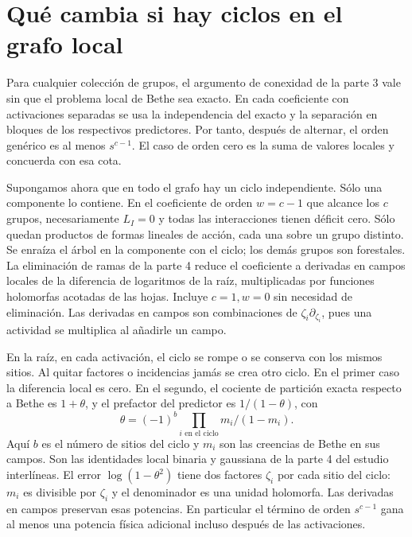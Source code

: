 \section{Qué cambia si hay ciclos en el grafo local}
Para cualquier colección de grupos, el argumento de conexidad de la parte 3 vale sin
que el problema local de Bethe sea exacto. En cada coeficiente con activaciones
separadas se usa la independencia del exacto y la separación en bloques de los respectivos
predictores. Por tanto, después de alternar, el orden genérico es al menos $s^{c-1}$.
El caso de orden cero es la suma de valores locales y concuerda con esa cota.

Supongamos ahora que en todo el grafo hay un ciclo independiente. Sólo una componente lo
contiene. En el coeficiente de orden $w=c-1$ que alcance los $c$ grupos, necesariamente
$L_I=0$ y todas las interacciones tienen déficit cero. Sólo quedan productos de formas
lineales de acción, cada una sobre un grupo distinto. Se enraíza el árbol en la componente
con el ciclo; los demás grupos son forestales. La eliminación de ramas de la parte 4
reduce el coeficiente a derivadas en campos locales de la diferencia de logaritmos de la
raíz, multiplicadas por funciones holomorfas acotadas de las hojas. Incluye $c=1,w=0$
sin necesidad de eliminación. Las derivadas en campos son combinaciones de
$\zeta_i\partial_{\zeta_i}$, pues una actividad se multiplica al añadirle un campo.

En la raíz, en cada activación, el ciclo se rompe o se conserva con los mismos sitios.
Al quitar factores o incidencias jamás se crea otro ciclo. En el primer caso la diferencia
local es cero. En el segundo, el cociente de partición exacta respecto a Bethe es
$1+\theta$, y el prefactor del predictor es $1/(1-\theta)$, con
\[
 \theta=(-1)^b\prod_{i\text{ en el ciclo}} m_i/(1-m_i).
\]
Aquí $b$ es el número de sitios del ciclo y $m_i$ son las creencias de Bethe en sus campos.
Son las identidades local binaria y gaussiana de la parte 4 del estudio interlíneas.
El error $\log(1-\theta^2)$ tiene dos factores $\zeta_i$ por cada sitio del ciclo:
$m_i$ es divisible por $\zeta_i$ y el denominador es una unidad holomorfa.
Las derivadas en campos preservan esas potencias. En particular el término de orden
$s^{c-1}$ gana al menos una potencia física adicional incluso después de las activaciones.

